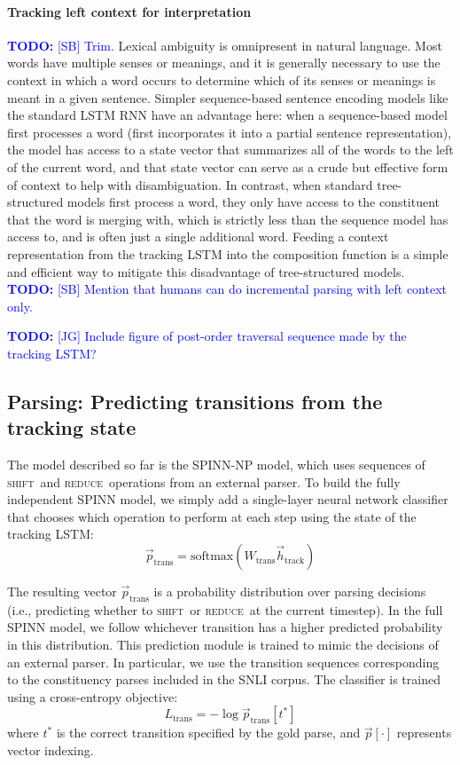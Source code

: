 \documentclass[11pt]{article}
\newcommand\todo[1]{\textcolor{blue}{\textbf{TODO:} #1}}
\newcommand{\shift}{\textsc{shift}}
\newcommand{\reduce}{\textsc{reduce}}
\begin{document}
\paragraph{Tracking left context for interpretation} \todo{[SB] Trim.} Lexical ambiguity is omnipresent in natural language. Most words have multiple senses or meanings, and it is generally necessary to use the context in which a word occurs to determine which of its senses or meanings is meant in a given sentence. Simpler sequence-based sentence encoding models like the standard LSTM RNN have an advantage here: when a sequence-based model first processes a word (first incorporates it into a partial sentence representation), the model has access to a state vector that summarizes all of the words to the left of the current word, and that state vector can serve as a crude but effective form of context to help with disambiguation. In contrast, when standard tree-structured models first process a word, they only have access to the constituent that the word is merging with, which is strictly less than the sequence model has access to, and is often just a single additional word. Feeding a context representation from the tracking LSTM into the composition function is a simple and efficient way to mitigate this disadvantage of tree-structured models. \todo{[SB] Mention that humans can do incremental parsing with left context only.}

\todo{[JG] Include figure of post-order traversal sequence made by the tracking LSTM?}

\subsection{Parsing: Predicting transitions from the tracking state}

The model described so far is the SPINN-NP model, which uses sequences of \shift~and \reduce~operations from an external parser. To build the fully independent SPINN model, we simply add a single-layer neural network classifier that chooses which operation to perform at each step using the state of the tracking LSTM:
\begin{equation}
\vec{p}_{\text{trans}} = \text{softmax}(W_{\text{trans}}\vec{h}_{\text{track}})
\end{equation}

The resulting vector $\vec{p}_{\text{trans}}$ is a probability distribution over parsing decisions (i.e., predicting whether to \shift~or \reduce~at the current timestep). In the full SPINN model, we follow whichever transition has a higher predicted probability in this distribution. This prediction module is trained to mimic the decisions of an external parser. In particular, we use the transition sequences corresponding to the constituency parses included in the SNLI corpus. The classifier is trained using a cross-entropy objective:
\begin{equation}
  L_{\text{trans}} = - \log \vec{p}_{\text{trans}}[t^*]
\end{equation}
where $t^*$ is the correct transition specified by the gold parse, and $\vec{p}[\cdot]$ represents vector indexing.
\end{document}
